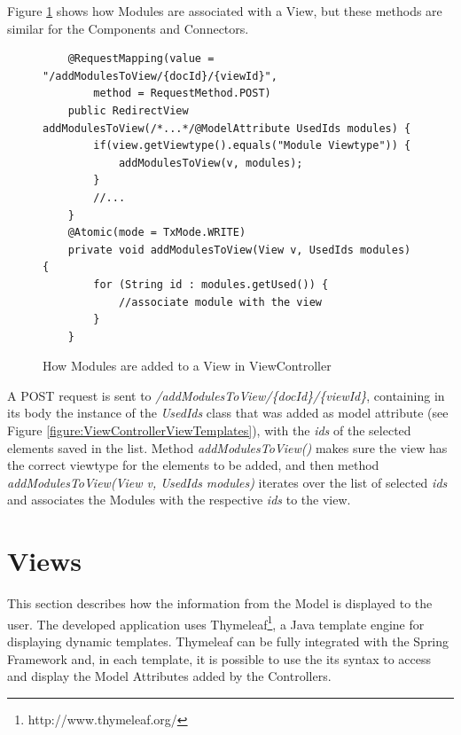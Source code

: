 Figure \ref{figure:ViewControllerAddModules} shows how Modules are associated with a View, but these methods are similar for the Components and Connectors. 
\begin{figure}[h]
\lstset{style=customjava}
\begin{lstlisting}
	@RequestMapping(value = "/addModulesToView/{docId}/{viewId}", 
		method = RequestMethod.POST)
	public RedirectView addModulesToView(/*...*/@ModelAttribute UsedIds modules) {
		if(view.getViewtype().equals("Module Viewtype")) {
			addModulesToView(v, modules);
		}
		//...
	}
	@Atomic(mode = TxMode.WRITE)
	private void addModulesToView(View v, UsedIds modules) {
		for (String id : modules.getUsed()) {
			//associate module with the view
		}
	}	
\end{lstlisting}
\caption{How Modules are added to a View in ViewController}
\label{figure:ViewControllerAddModules}
\end{figure}
A POST request is sent to \textit{/addModulesToView/\{docId\}/\{viewId\}}, containing in its body the instance of the \textit{UsedIds} class that was added as model attribute (see Figure \ref{figure:ViewControllerViewTemplates}), with the \textit{ids} of the selected elements saved in the list. Method \textit{addModulesToView()} makes sure the view has the correct viewtype for the elements to be added, and then method \textit{addModulesToView(View v, UsedIds modules)} iterates over the list of selected \textit{ids} and associates the Modules with the respective \textit{ids} to the view.

\section{Views}
\label{section:Views}
This section describes how the information from the Model is displayed to the user. The developed application uses Thymeleaf\footnote{http://www.thymeleaf.org/}, a Java template engine for displaying dynamic templates. Thymeleaf can be fully integrated with the Spring Framework and, in each template, it is possible to use the its syntax to access and display the Model Attributes added by the Controllers. 

